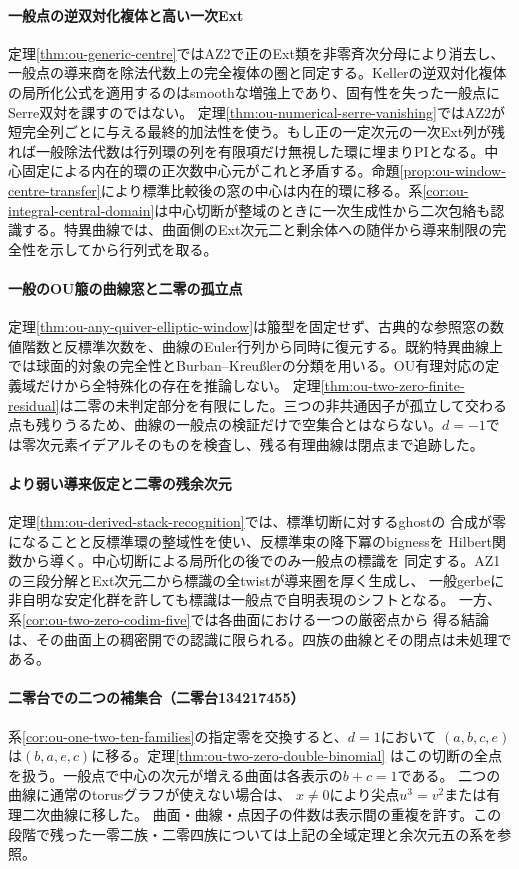 \documentclass[11pt,a4paper]{ltjsarticle}
\begin{document}
\paragraph{一般点の逆双対化複体と高い一次Ext}
定理\ref{thm:ou-generic-centre}ではAZ2で正のExt類を非零斉次分母により消去し、一般点の導来商を除法代数上の完全複体の圏と同定する。Kellerの逆双対化複体の局所化公式を適用するのはsmoothな増強上であり、固有性を失った一般点にSerre双対を課すのではない。
定理\ref{thm:ou-numerical-serre-vanishing}ではAZ2が短完全列ごとに与える最終的加法性を使う。もし正の一定次元の一次Ext列が残れば一般除法代数は行列環の列を有限項だけ無視した環に埋まりPIとなる。中心固定による内在的環の正次数中心元がこれと矛盾する。命題\ref{prop:ou-window-centre-transfer}により標準比較後の窓の中心は内在的環に移る。系\ref{cor:ou-integral-central-domain}は中心切断が整域のときに一次生成性から二次包絡も認識する。特異曲線では、曲面側のExt次元二と剰余体への随伴から導来制限の完全性を示してから行列式を取る。

\paragraph{一般のOU箙の曲線窓と二零の孤立点}
定理\ref{thm:ou-any-quiver-elliptic-window}は箙型を固定せず、古典的な参照窓の数値階数と反標準次数を、曲線のEuler行列から同時に復元する。既約特異曲線上では球面的対象の完全性とBurban--Kreu{\ss}lerの分類を用いる。OU有理対応の定義域だけから全特殊化の存在を推論しない。
定理\ref{thm:ou-two-zero-finite-residual}は二零の未判定部分を有限にした。三つの非共通因子が孤立して交わる点も残りうるため、曲線の一般点の検証だけで空集合とはならない。$d=-1$では零次元素イデアルそのものを検査し、残る有理曲線は閉点まで追跡した。

\paragraph{より弱い導来仮定と二零の残余次元}
定理\ref{thm:ou-derived-stack-recognition}では、標準切断に対するghostの
合成が零になることと反標準環の整域性を使い、反標準束の降下冪のbignessを
Hilbert関数から導く。中心切断による局所化の後でのみ一般点の標識を
同定する。AZ1の三段分解とExt次元二から標識の全twistが導来圏を厚く生成し、
一般gerbeに非自明な安定化群を許しても標識は一般点で自明表現のシフトとなる。
一方、系\ref{cor:ou-two-zero-codim-five}では各曲面における一つの厳密点から
得る結論は、その曲面上の稠密開での認識に限られる。四族の曲線とその閉点は未処理である。

\paragraph{二零台での二つの補集合（二零台134217455）}
系\ref{cor:ou-one-two-ten-families}の指定零を交換すると、$d=1$において
$(a,b,c,e)$は$(b,a,e,c)$に移る。定理\ref{thm:ou-two-zero-double-binomial}
はこの切断の全点を扱う。一般点で中心の次元が増える曲面は各表示の$b+c=1$である。
二つの曲線に通常のtorusグラフが使えない場合は、
$x\ne0$により尖点$u^3=v^2$または有理二次曲線に移した。
曲面・曲線・点因子の件数は表示間の重複を許す。この段階で残った一零二族・二零四族については上記の全域定理と余次元五の系を参照。
\end{document}
